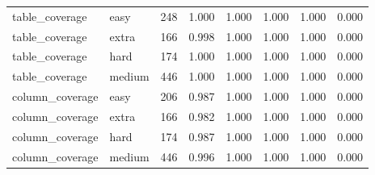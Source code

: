 \begin{table}[htbp]
\begin{tabular}{llrrrrrr}
table_coverage & easy & 248 & 1.000 & 1.000 & 1.000 & 1.000 & 0.000 \\
table_coverage & extra & 166 & 0.998 & 1.000 & 1.000 & 1.000 & 0.000 \\
table_coverage & hard & 174 & 1.000 & 1.000 & 1.000 & 1.000 & 0.000 \\
table_coverage & medium & 446 & 1.000 & 1.000 & 1.000 & 1.000 & 0.000 \\
column_coverage & easy & 206 & 0.987 & 1.000 & 1.000 & 1.000 & 0.000 \\
column_coverage & extra & 166 & 0.982 & 1.000 & 1.000 & 1.000 & 0.000 \\
column_coverage & hard & 174 & 0.987 & 1.000 & 1.000 & 1.000 & 0.000 \\
column_coverage & medium & 446 & 0.996 & 1.000 & 1.000 & 1.000 & 0.000 \\
\bottomrule
\end{tabular}
\end{table}
